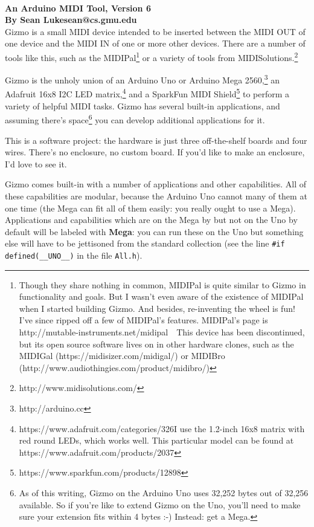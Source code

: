 \documentclass{article}
\begin{document}
\\[0.5em]
{\large \bf An Arduino MIDI Tool, Version 6\\
By Sean Luke\quad sean@cs.gmu.edu} 
\\


\noindent Gizmo is a small MIDI device intended to be inserted between the MIDI OUT of one device and the MIDI IN of one or more other devices.  There are a number of tools like this, such as the MIDIPal\footnote{Though they share nothing in common, MIDIPal is quite similar to Gizmo in functionality and goals.  But I wasn't even aware of the existence of MIDIPal when I started building Gizmo.  And besides, re-inventing the wheel is fun!  I've since ripped off a few of MIDIPal's features.  MIDIPal's page is http:/\!/mutable-instruments.net/midipal\ \ This device has been discontinued, but its open source software lives on in other hardware clones, such as the MIDIGal (https:/\!/midisizer.com/midigal/) or MIDIBro (http:/\!/www.audiothingies.com/product/midibro/)} or a variety of tools from MIDISolutions.\footnote{http:/\!/www.midisolutions.com/}

Gizmo is the unholy union of an Arduino Uno or Arduino Mega 2560,\footnote{http:/\!/arduino.cc} an Adafruit 16x8 I2C LED matrix,\footnote{https:/\!/www.adafruit.com/categories/326\quad I use the 1.2-inch 16x8 matrix with red round LEDs, which works well.  This particular model can be found at https:/\!/www.adafruit.com/products/2037} and a SparkFun MIDI Shield\footnote{https:/\!/www.sparkfun.com/products/12898} to perform a variety of helpful MIDI tasks.  Gizmo has several built-in applications, and assuming there's space\footnote{As of this writing, Gizmo on the Arduino Uno uses 32,252 bytes out of 32,256 available.  So if you're like to extend Gizmo on the Uno, you'll need to make sure your extension fits within 4 bytes :-)  Instead: get a Mega.} you can develop additional applications for it.

This is a software project: the hardware is just three off-the-shelf boards and four wires.  There's no enclosure, no custom board.  If you'd like to make an enclosure, I'd love to see it.

Gizmo comes built-in with a number of applications and other capabilities.  All of these capabilities are modular, because the Arduino Uno cannot many of them at one time (the Mega can fit all of them easily: you really ought to use a Mega).  Applications and capabilities which are on the Mega by but not on the Uno by default will be labeled with {\bf Mega}: you can run these on the Uno but something else will have to be jettisoned from the standard collection (see the line {\tt \#if defined(\_\_UNO\_\_)} in the file \texttt{All.h}).
\end{document}
